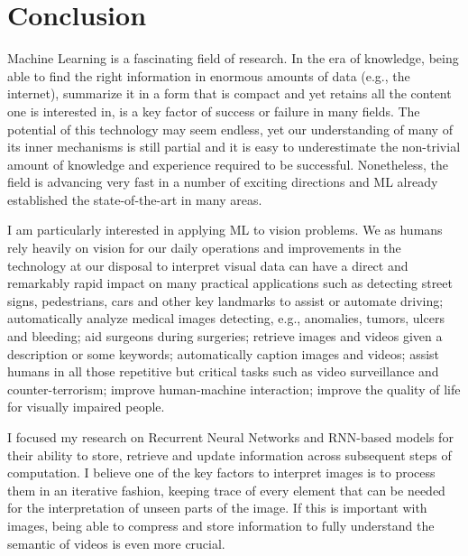 \chapter{Conclusion}\label{sec:conclusion}

Machine Learning is a fascinating field of research. In the era of knowledge,
being able to find the right information in enormous amounts of data (e.g., the
internet), summarize it in a form that is compact and yet retains all the
content one is interested in, is a key factor of success or failure in many
fields. The potential of this technology may seem endless, yet our
understanding of many of its inner mechanisms is still partial and it is easy
to underestimate the non-trivial amount of knowledge and experience required to
be successful.  Nonetheless, the field is advancing very fast in a number of
exciting directions and ML already established the state-of-the-art in many
areas.

I am particularly interested in applying ML to vision problems. We as humans
rely heavily on vision for our daily operations and improvements in the
technology at our disposal to interpret visual data can have a direct and
remarkably rapid impact on many practical applications such as detecting
street signs, pedestrians, cars and other key landmarks to assist or automate
driving; automatically analyze medical images detecting, e.g., anomalies,
tumors, ulcers and bleeding; aid surgeons during surgeries; retrieve images and
videos given a description or some keywords; automatically caption images and
videos; assist humans in all those repetitive but critical tasks such as video
surveillance and counter-terrorism; improve human-machine interaction; improve
the quality of life for visually impaired people.

I focused my research on Recurrent Neural Networks and RNN-based models for
their ability to store, retrieve and update information across subsequent steps
of computation. I believe one of the key factors to interpret images is to
process them in an iterative fashion, keeping trace of every element that can
be needed for the interpretation of unseen parts of the image. If this is
important with images, being able to compress and store information to
fully understand the semantic of videos is even more crucial.

